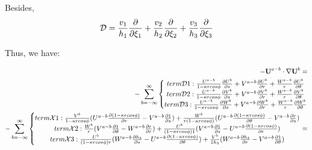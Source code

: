 \documentclass{Note}
\begin{document}
Besides,
\begin{equation}
\begin{aligned}
\mathcal{D}={v_1\over{h_1}}{\partial \over {\partial \xi_1}}+{v_2\over{h_2}}{\partial \over {\partial \xi_2}}+{v_3\over{h_3}}{\partial \over {\partial \xi_3}}
\end{aligned}
\end{equation}

Thus, we have:

\begin{equation}
\begin{aligned}
-\textbf{U}^{a-b}\cdot \nabla \textbf{U}^b=\\-\sum_{b=-\infty}^{\infty}
\left\{\begin{matrix}
term\mathcal{D}1: {U^{a-b}\over {1-\kappa r cos\phi}}  {{\partial U^b} \over {\partial s}}+V^{a-b}{{\partial U^b}\over{\partial r}}+{W^{a-b}\over r}{{\partial U^b}\over {\partial \theta}}\\
term\mathcal{D}2: {U^{a-b}\over {1-\kappa r cos\phi}}  {{\partial V^b} \over {\partial s}}+V^{a-b}{{\partial V^b}\over{\partial r}}+{W^{a-b}\over r}{{\partial V^b}\over {\partial \theta}}\\
term\mathcal{D}3: {U^{a-b}\over {1-\kappa r cos\phi}}  {{\partial W^b} \over {\partial s}}+V^{a-b}{{\partial W^b}\over{\partial r}}+{W^{a-b}\over r}{{\partial W^b}\over {\partial \theta}}\\
\end{matrix}\right.\\
-\sum_{b=-\infty}^{\infty}\left\{\begin{matrix}
term\mathcal{X}1: {V^b\over{1-\kappa rcos\phi}}(U^{a-b}{{\partial (1-\kappa r cos\phi)}\over {\partial r}}-V^{a-b}{{\partial 1}\over {\partial s}})+{W^b\over{r(1-\kappa r cos\phi)}}(U^{a-b}{{\partial (1-\kappa r cos\phi)}\over {\partial \theta}}-V^{a-b}{{\partial r}\over {\partial s}})\\
term\mathcal{X}2: {W^b\over{r}}(V^{a-b}{{\partial 1}\over {\partial \theta}}-W^{a-b}{{\partial r}\over {\partial r}})+{U^b\over{(1-\kappa r cos\phi)1}}(V^{a-b}{{\partial 1}\over {\partial s}}-U^{a-b}{{\partial (1-\kappa r cos\phi)}\over {\partial r}})\\
term\mathcal{X}3: {U^b\over{(1-\kappa r cos\phi)r}}(W^{a-b}{{\partial h_3}\over {\partial s}}-U^{a-b}{{\partial (1-\kappa r cos\phi)}\over {\partial \theta}})+{V^b\over{1h_3}}(W^{a-b}{{\partial h_3}\over {\partial r}}-V^{a-b}{{\partial 1}\over {\partial \theta}})\\
\end{matrix}\right.=

\end{aligned}
\end{equation}
\end{document}
